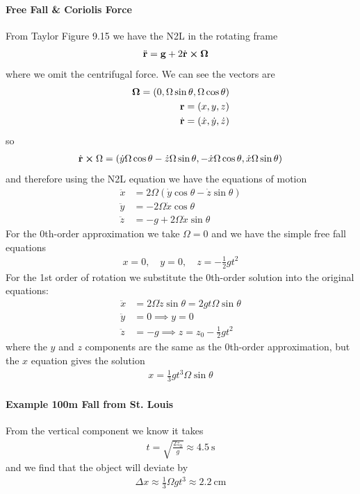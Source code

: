 \documentclass[../main.tex]{subfiles}
\begin{document}
\paragraph*{Free Fall \& Coriolis Force} From Taylor Figure 9.15 we have the N2L in the rotating frame
\begin{align*}
    \ddot{\vb r} &= \vb g + 2 \dot{\vb r} \cross \vb \Omega
\end{align*}
where we omit the centrifugal force. We can see the vectors are
\begin{align*}
    \vb \Omega = (0, \Omega \sin\theta, \Omega \cos\theta) \\
    \vb r = (x ,y, z) \\
    \dot{\vb r} = (\dot x, \dot y, \dot z)
\end{align*}
so
\begin{align*}
    \dot{\vb r} \cross \Omega = (\dot y \Omega \cos\theta - \dot z \Omega \sin\theta, -\dot x \Omega \cos\theta, \dot x \Omega \sin\theta)
\end{align*}
and therefore using the N2L equation we have the equations of motion
\begin{align*}
    \ddot x &= 2\Omega (\dot y \cos\theta - \dot z \sin\theta) \\
    \ddot y &= -2\Omega \dot x \cos\theta \\
    \ddot z &= - g + 2\Omega \dot x \sin\theta
\end{align*}
For the 0th-order approximation we take $\Omega = 0$ and we have the simple free fall equations
\begin{align*}
    x = 0,\quad y = 0,\quad z = -\frac{1}{2}gt^2
\end{align*}
For the 1st order of rotation we substitute the 0th-order solution into the original equations:
\begin{align*}
    \ddot x &= 2\Omega \dot z \sin\theta = 2 gt \Omega \sin\theta \\
    \ddot y &= 0 \implies y = 0 \\
    \ddot z &= -g \implies z = z_0 - \frac{1}{2} gt^2
\end{align*}
where the $y$ and $z$ components are the same as the 0th-order approximation, but the $x$ equation
gives the solution
\begin{align*}
    x = \frac{1}{3} gt^3 \Omega \sin\theta
\end{align*}
\paragraph*{Example 100m Fall from St. Louis} From the vertical component we know it takes
\begin{align*}
    t = \sqrt{\frac{2z_0}{g}} \approx \qty{4.5}{\s}
\end{align*}
and we find that the object will deviate by
\begin{align*}
    \Delta x \approx \frac{1}{3} \Omega g t^3 \approx \qty{2.2}{\cm}
\end{align*}
\end{document}
